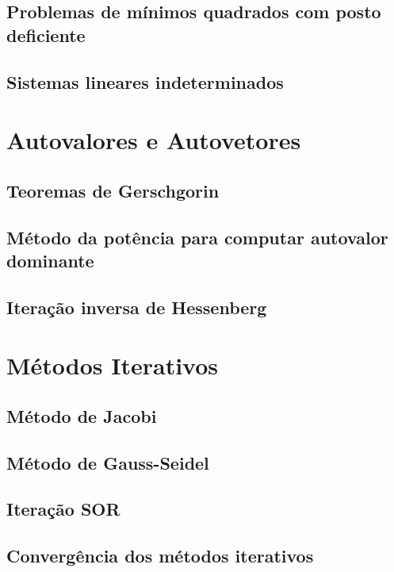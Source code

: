 \documentclass{article}
\begin{document}
\subsection{Problemas de mínimos quadrados com posto deficiente}
\subsection{Sistemas lineares indeterminados}

\section{Autovalores e Autovetores}
\subsection{Teoremas de Gerschgorin}
\subsection{Método da potência para computar autovalor dominante}
\subsection{Iteração inversa de Hessenberg}

\section{Métodos Iterativos}
\subsection{Método de Jacobi}
\subsection{Método de Gauss-Seidel}
\subsection{Iteração SOR}
\subsection{Convergência dos métodos iterativos}
\end{document}
